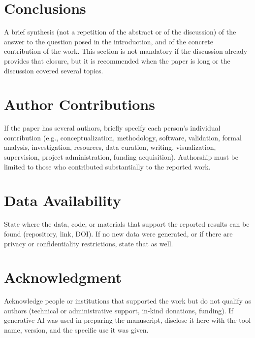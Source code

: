 \documentclass[lettersize,journal]{IEEEtran}
\begin{document}
\section{Conclusions}

A brief synthesis (not a repetition of the abstract or of the
discussion) of the answer to the question posed in the introduction,
and of the concrete contribution of the work. This section is not
mandatory if the discussion already provides that closure, but it is
recommended when the paper is long or the discussion covered several
topics.


\section*{Author Contributions}
If the paper has several authors, briefly specify each person's
individual contribution (e.g., conceptualization, methodology,
software, validation, formal analysis, investigation, resources, data
curation, writing, visualization, supervision, project administration,
funding acquisition). Authorship must be limited to those who
contributed substantially to the reported work.

\section*{Data Availability}
State where the data, code, or materials that support the reported
results can be found (repository, link, DOI). If no new data were
generated, or if there are privacy or confidentiality restrictions,
state that as well.

\section*{Acknowledgment}
Acknowledge people or institutions that supported the work but do
not qualify as authors (technical or administrative support, in-kind
donations, funding). If generative AI was used in preparing the
manuscript, disclose it here with the tool name, version, and the
specific use it was given.
\end{document}

